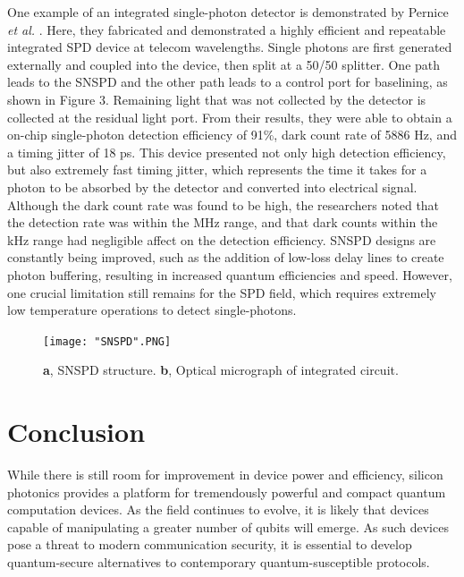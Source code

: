 \documentclass[letterpaper, 10 pt, conference]{ieeeconf}  %
\begin{document}
One example of an integrated single-photon detector is demonstrated by Pernice \textit{et al.} \cite{SNSPD}. Here, they fabricated and demonstrated a highly efficient and repeatable integrated SPD device at telecom wavelengths. Single photons are first generated externally and coupled into the device, then split at a 50/50 splitter. One path leads to the SNSPD and the other path leads to a control port for baselining, as shown in Figure 3. Remaining light that was not collected by the detector is collected at the residual light port. From their results, they were able to obtain a on-chip single-photon detection efficiency of 91\%, dark count rate of 5886 Hz, and a timing jitter of 18 ps. This device presented not only high detection efficiency, but also extremely fast timing jitter, which represents the time it takes for a photon to be absorbed by the detector and converted into electrical signal. Although the dark count rate was found to be high, the researchers noted that the detection rate was within the MHz range, and that dark counts within the kHz range had negligible affect on the detection efficiency. SNSPD designs are constantly being improved, such as the addition of low-loss delay lines to create photon buffering, resulting in increased quantum efficiencies and speed. However, one crucial limitation still remains for the SPD field, which requires extremely low temperature operations to detect single-photons.

\begin{figure}[htbp]
    \centering
    \texttt{[image: "SNSPD".PNG]}
    \caption{\textbf{a}, SNSPD structure. \textbf{b}, Optical micrograph of integrated circuit.}
    \label{fig:3}
\end{figure} 




\section{Conclusion}

While there is still room for improvement in device power and efficiency, silicon photonics provides a platform for tremendously powerful and compact quantum computation devices. As the field continues to evolve, it is likely that devices capable of manipulating a greater number of qubits will emerge. As such devices pose a threat to modern communication security, it is essential to develop quantum-secure alternatives to contemporary quantum-susceptible protocols. 
\end{document}
